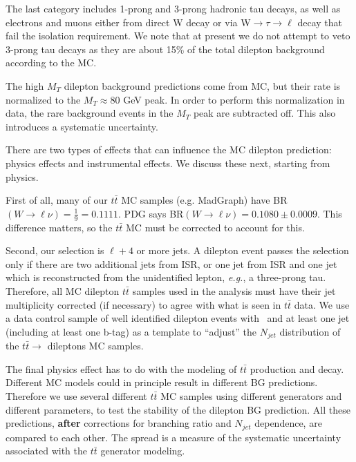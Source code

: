 The last category includes 1-prong and 3-prong hadronic tau decays, as well as electrons and muons either from direct W decay or via W$\to\tau\to\ell$ decay 
that fail the isolation requirement.
We note that at present we do not attempt to veto 3-prong tau decays as they are about 15\% of the total dilepton background according to the MC.

The high $M_T$ dilepton background predictions come from MC, but their rate is normalized to the 
$M_T \approx 80$ GeV peak.  In order to perform this normalization in
data, the rare background events in the $M_T$ peak are subtracted off.  This also introduces a systematic uncertainty.

There are two types of effects that can influence the MC dilepton prediction: physics effects 
and instrumental effects.  We discuss these next, starting from physics.

First of all, many of our $t\bar{t}$ MC samples (e.g. MadGraph) have
 BR$(W \to \ell \nu)=\frac{1}{9} = 0.1111$.
PDG says BR$(W \to \ell \nu) = 0.1080 \pm 0.0009$.  This difference matters, so the $t\bar{t}$ MC 
must be corrected to account for this.

Second, our selection is $\ell +4$ or more jets.  A dilepton event passes the selection only if there are 
two additional jets from ISR, or one jet from ISR and one jet which is reconstructed from the 
unidentified lepton, {\it e.g.}, a three-prong tau.  Therefore, all MC dilepton $t\bar{t}$ samples used
in the analysis must have their jet multiplicity corrected (if necessary) to agree with what is 
seen in $t\bar{t}$ data.  We use a data control sample of well identified dilepton events with
\met\ and at least one jet (including at least one b-tag) as a template to ``adjust'' the $N_{jet}$ distribution of the $t\bar{t} \to$
dileptons MC samples.

The final physics effect has to do with the modeling of $t\bar{t}$ production and decay.  Different
MC models could in principle result in different BG predictions.  Therefore we use several different 
$t\bar{t}$ MC samples using different generators and different parameters, to test the stability
of the dilepton BG prediction.  All these predictions, {\bf after} corrections for branching ratio
and $N_{jet}$ dependence, are compared to each other.  The spread is a measure of the systematic
uncertainty associated with the $t\bar{t}$ generator modeling.


